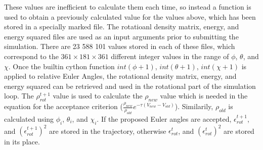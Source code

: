 \documentclass{ece}
\begin{document}
These values are inefficient to calculate them each time, so instead a function is used to obtain a previously calculated value for the values above, which has been stored in a specially marked file. The rotatioanl density matrix, energy, and energy squared files are used as an input arguments prior to submitting the simulation. There are 23 588 101 values stored in each of these files, which correspond to the \begin{math} 361 \times 181 \times 361 \end{math} different integer values in the range of \begin{math} \phi \end{math}, \begin{math} \theta \end{math}, and \begin{math} \chi\end{math}. Once the builtin cython function \begin{math} int( \phi + 1 ) \end{math}, \begin{math} int( \theta + 1 ) \end{math}, \begin{math} int( \chi + 1 ) \end{math}  is applied to relative Euler Angles, the rotational density matrix, energy, and energy squared can be retrieved and used in the rotational part of the simulation loop. The \begin{math} \rho_{rot}^{t+1} \end{math} value is used to calculate the \begin{math} \rho_{new} \end{math} value which is needed in the equation for the acceptance criterion (\begin{math} \frac{\rho_{new}}{\rho_{old}} e^{- \tau ( V_{new} - V_{old} )} \end{math}). Similarily, \begin{math} \rho_{old} \end{math} is calculated using \begin{math} \phi_{i} \end{math}, \begin{math} \theta_{i} \end{math}, and \begin{math} \chi_{i} \end{math}. If the proposed Euler angles are accepted, \begin{math} \epsilon_{rot}^{t+1} \end{math}, and \begin{math} ( \epsilon_{rot}^{t+1} )^2 \end{math} are stored in the trajectory, otherwise \begin{math} \epsilon_{rot}^{t} \end{math}, and \begin{math} ( \epsilon_{rot}^{t} )^2 \end{math} are stored in its place. 
\end{document}
